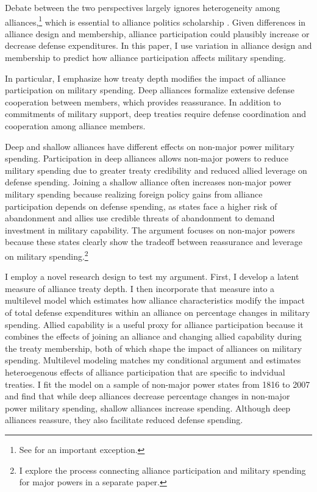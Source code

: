 \documentclass[12pt]{article}
\begin{document}
Debate between the two perspectives largely ignores heterogeneity among alliances,\footnote{See \citet{DigiuseppePoast2016} for an important exception.} which is essential to alliance politics scholarship \citep{Morrow1991, Leeds2003, LeedsAnac2005, Fordham2010, Mattes2012, Benson2012, Poast2013, Johnsonetal2015}.  
Given differences in alliance design and membership, alliance participation could plausibly increase or decrease defense expenditures. 
In this paper, I use variation in alliance design and membership to predict how alliance participation affects military spending. 


In particular, I emphasize how treaty depth modifies the impact of alliance participation on military spending. 
Deep alliances formalize extensive defense cooperation between members, which provides reassurance. 
In addition to commitments of military support, deep treaties require defense coordination and cooperation among alliance members. 


Deep and shallow alliances have different effects on non-major power military spending. 
Participation in deep alliances allows non-major powers to reduce military spending due to greater treaty credibility and reduced allied leverage on defense spending. 
Joining a shallow alliance often increases non-major power military spending because realizing foreign policy gains from alliance participation depends on defense spending, as states face a higher risk of abandonment and allies use credible threats of abandonment to demand investment in military capability.
The argument focuses on non-major powers because these states clearly show the tradeoff between reassurance and leverage on military spending.\footnote{I explore the process connecting alliance participation and military spending for major powers in a separate paper.} 
 

I employ a novel research design to test my argument.
First, I develop a latent measure of alliance treaty depth. 
I then incorporate that measure into a multilevel model which estimates how alliance characteristics modify the impact of total defense expenditures within an alliance on percentage changes in military spending.
Allied capability is a useful proxy for alliance participation because it combines the effects of joining an alliance and changing allied capability during the treaty membership, both of which shape the impact of alliances on military spending. 
Multilevel modeling matches my conditional argument and estimates heteroegenous effects of alliance participation that are specific to indvidual treaties. 
I fit the model on a sample of non-major power states from 1816 to 2007 and find that while deep alliances decrease percentage changes in non-major power military spending, shallow alliances increase spending.
Although deep alliances reassure, they also facilitate reduced defense spending. 
\end{document}
